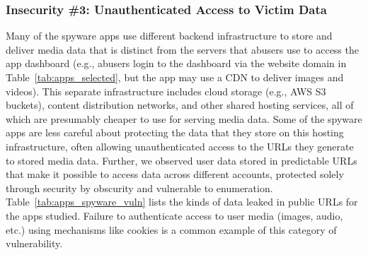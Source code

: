 
\subsubsection*{Insecurity \#3: Unauthenticated Access to Victim Data}
\label{sec:leaky-urls}


Many of the spyware apps use different backend infrastructure to store
and deliver media data that is distinct from the servers that
abusers use to access the app dashboard (e.g., abusers login
to the dashboard via the website domain in Table~\ref{tab:apps_selected}, but
the app may use a CDN to deliver images and videos).
This separate infrastructure
includes cloud storage (e.g., AWS S3 buckets), content distribution
networks, and other shared hosting services, all of which are
presumably cheaper to use for serving media data.
Some of the spyware apps are less careful about protecting the
data that they store on this hosting infrastructure, often allowing
unauthenticated access to the URLs they generate to stored media data.
Further, we observed user data stored in predictable URLs that make it
possible to access data across different accounts, protected solely
through security by obscurity and vulnerable to enumeration. Table~\ref{tab:apps_spyware_vuln} lists
the kinds of data leaked in public URLs for the apps studied. Failure
to authenticate access to user media (images, audio, etc.) using
mechanisms like cookies is a common example of this category of
vulnerability.

